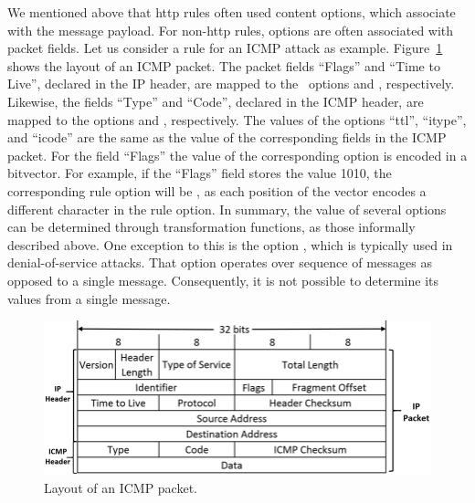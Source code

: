 \documentclass[sigconf,review, anonymous]{acmart}
\begin{document}
We mentioned above that http rules often used content options, which
associate with the message payload. For non-http rules, options are
often associated with packet fields. Let us consider a rule for an
ICMP attack as example. Figure~\ref{fig:icmp-packet-layout} shows the
layout of an ICMP packet. The packet fields ``Flags'' and ``Time to
Live'', declared in the IP header, are mapped to the \suri\ options
 and , respectively. Likewise, the fields
``Type'' and ``Code'', declared in the ICMP header, are mapped to the
options  and , respectively. The values of
the options ``ttl'', ``itype'', and ``icode'' are the same as the
value of the corresponding fields in the ICMP packet. For the field
``Flags'' the value of the corresponding option is encoded in a
bitvector. For example, if the ``Flags'' field stores the value 1010,
the corresponding rule option will be , as each
position of the vector encodes a different character in the
 rule option. In summary, the value of several
options can be determined through transformation functions, as those
informally described above. One exception to this is the option
, which is typically used in denial-of-service
attacks. That option operates over sequence of messages as opposed to
a single message. Consequently, it is not possible to determine its
values from a single message.

\begin{figure}[t!]
\centering
\includegraphics[scale=0.28]{figs/ICMP-packet-structure.png}
\vspace{-2ex}
\caption{Layout of an ICMP packet.}
\label{fig:icmp-packet-layout}
\end{figure}

\end{document}
